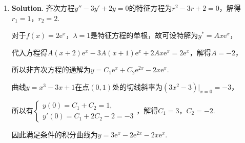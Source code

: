 \documentclass[../main.tex]{subfiles}
\begin{document}
\begin{enumerate}
    \item \textbf{Solution}. 齐次方程$y''-3y'+2y=0$的特征方程为$r^{2}-3r+2=0$，解得$r
                  _{1}=1$，$r_{2}=2$.

          对于$f(x)=2\mathrm{e}^{x}$，$\lambda=1$是特征方程的单根，故可设特解为$y^{*}
              =Ax\mathrm{e}^{x}$，

          代入方程得$A(x+2)\mathrm{e}^{x}-3A(x+1)\mathrm{e}^{x}+2Ax\mathrm{e}^{x}=2\mathrm{e}
              ^{x}$，解得$A=-2$，

          所以非齐次方程的通解为$y=C_{1}\mathrm{e}^{x}+C_{2}\mathrm{e}^{2x}-2x\mathrm{e}
              ^{x}$.

          曲线$y=x^{3}-3x+1$在点$(0,1)$处的切线斜率为$(3x^{2}-3)\bigg|_{x=0}=-3$，

          所以有$\begin{cases}
                  y(0)=C_{1}+C_{2}=1, \\
                  y'(0)=C_{1}+2C_{2}-2=-3
              \end{cases}$，解得$C_{1}=3$，$C_{2}=-2$.

          因此满足条件的积分曲线为$y=3\mathrm{e}^{x}-2\mathrm{e}^{2x}-2x\mathrm{e}^{x}$.


\end{enumerate}
\end{document}
